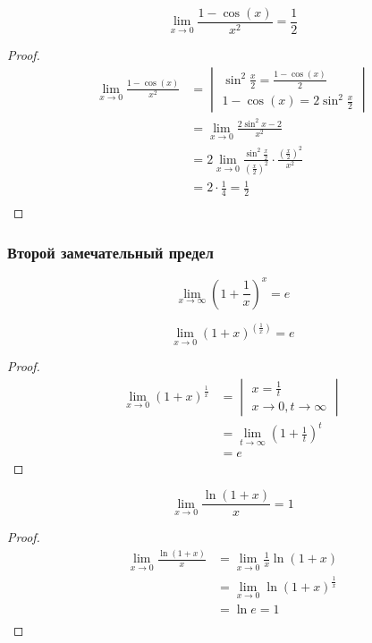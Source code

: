 \begin{corollary}
  \[
  \lim_{x \to 0} \frac{1 - \cos(x)}{x^2} = \frac{1}{2}
  \] 
\end{corollary}
\begin{proof}
  \begin{align*}
    \lim_{x \to 0} \frac{1 - \cos(x)}{x^2} &= 
    \begin{vmatrix}
      \sin^2 \frac{x}{2} = \frac{1 - \cos(x)}{2} \\
      1 - \cos(x) = 2 \sin^2 \frac{x}{2}
    \end{vmatrix}
    \\
    &= \lim_{x \to 0} \frac{2\sin^2 x-2}{x^2} \\
    &= 2 \lim_{x \to 0} \frac{\sin^2 \frac{x}{2}}{(\frac{x}{2})^2} \cdot \frac{(\frac{x}{2})^2}{x^2} \\
    &= 2 \cdot \frac{1}{4} = \frac{1}{2} \\
  \end{align*}
\end{proof}

\subsubsection*{Второй замечательный предел}

\begin{theorem}
  \[
    \boxed{\lim_{x \to \infty} \left(1 + \frac{1}{x}\right)^x = e}
  \] 
\end{theorem}

\begin{corollary}
\[
  \lim_{x \to 0} \left( 1 + x \right)^\left( \frac{1}{x} \right) = e
\] 
\end{corollary}
\begin{proof}
  \begin{align*}
    \lim_{x \to 0} (1 + x)^{\frac{1}{x}} &= 
    \begin{vmatrix}
      x = \frac{1}{t} \\
      x \to 0, t \to \infty
    \end{vmatrix} \\
    &= \lim_{t \to \infty} \left( 1 + \frac{1}{t} \right) ^ t \\
    &= e
  \end{align*}
\end{proof}

\begin{corollary}
  \[
    \lim_{x \to 0} \frac{\ln(1 + x)}{x} = 1
  \] 
\end{corollary}
\begin{proof}
  \begin{align*}
    \lim_{x \to 0} \frac{\ln(1 + x)}{x} &= \lim_{x \to 0} \frac{1}{x}\ln(1 + x) \\
      &= \lim_{x \to 0} \ln \left( 1 + x \right) ^ {\frac{1}{x}} \\
      &= \ln e = 1\\
  \end{align*} 
\end{proof}

